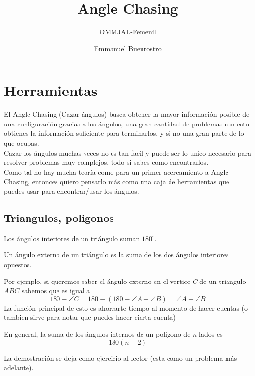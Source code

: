 \documentclass[11pt]{scrartcl}
\title {Angle Chasing}
\subtitle{OMMJAL-Femenil}
\author{Emmanuel Buenrostro}
\begin{document}
\maketitle
\section{Herramientas}
El Angle Chasing (Cazar \'angulos) busca obtener la mayor informaci\'on posible de una configuraci\'on gracias a los \'angulos, una gran cantidad de problemas con esto obtienes la informaci\'on suficiente para terminarlos, y si no una gran parte de lo que ocupas. \\
Cazar los \'angulos muchas veces no es tan facil y puede ser lo unico necesario para resolver problemas muy complejos, todo si sabes como encontrarlos.
\\
Como tal no hay mucha teor\'ia como para un primer acercamiento a Angle Chasing, entonces quiero pensarlo m\'as como una caja de herramientas que puedes usar para encontrar/usar los \'angulos. 
\subsection{Triangulos, poligonos}
\begin{proposition}
    Los \'angulos interiores de un tri\'angulo suman $180^{\circ}$.
\end{proposition}
\begin{theorem}
    Un \'angulo externo de un tri\'angulo es la suma de los dos \'angulos interiores opuestos.
\end{theorem}
Por ejemplo, si queremos saber el \'angulo externo en el vertice $C$ de un triangulo $ABC$ sabemos que es igual a 
$$180-\angle C=180-(180-\angle A-\angle B)=\angle A+\angle B$$
La funci\'on principal de esto es ahorrarte tiempo al momento de hacer cuentas (o tambien sirve para notar que puedes hacer cierta cuenta) \\
\begin{theorem}
    En general, la suma de los \'angulos internos de un poligono de $n$ lados es 
    $$180(n-2)$$
\end{theorem}
La demostraci\'on se deja como ejercicio al lector (esta como un problema m\'as adelante).
\end{document}
